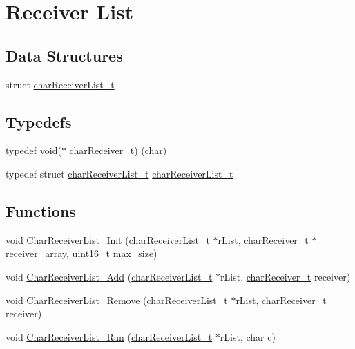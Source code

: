 \hypertarget{group__receiverlist}{}\section{Receiver List}
\label{group__receiverlist}
\subsection*{Data Structures}
\begin{DoxyCompactItemize}
\item 
struct \hyperlink{structchar_receiver_list__t}{char\+Receiver\+List\+\_\+t}
\end{DoxyCompactItemize}
\subsection*{Typedefs}
\begin{DoxyCompactItemize}
\item 
typedef void($\ast$ \hyperlink{group__receiverlist_ga69666a2f4dbb47a4ffd7b07c252777cf}{char\+Receiver\+\_\+t}) (char)
\item 
typedef struct \hyperlink{structchar_receiver_list__t}{char\+Receiver\+List\+\_\+t} \hyperlink{group__receiverlist_gaf028d96c57583ae1c99867ab37a4e097}{char\+Receiver\+List\+\_\+t}
\end{DoxyCompactItemize}
\subsection*{Functions}
\begin{DoxyCompactItemize}
\item 
void \hyperlink{group__receiverlist_ga8cf289548c12196023378e100c54ea7f}{Char\+Receiver\+List\+\_\+\+Init} (\hyperlink{structchar_receiver_list__t}{char\+Receiver\+List\+\_\+t} $\ast$r\+List, \hyperlink{group__receiverlist_ga69666a2f4dbb47a4ffd7b07c252777cf}{char\+Receiver\+\_\+t} $\ast$receiver\+\_\+array, uint16\+\_\+t max\+\_\+size)
\item 
void \hyperlink{group__receiverlist_ga08ce6fb053b59a46b55684e3be6c05e8}{Char\+Receiver\+List\+\_\+\+Add} (\hyperlink{structchar_receiver_list__t}{char\+Receiver\+List\+\_\+t} $\ast$r\+List, \hyperlink{group__receiverlist_ga69666a2f4dbb47a4ffd7b07c252777cf}{char\+Receiver\+\_\+t} receiver)
\item 
void \hyperlink{group__receiverlist_gafca888b64202be312447e5d1b83ae267}{Char\+Receiver\+List\+\_\+\+Remove} (\hyperlink{structchar_receiver_list__t}{char\+Receiver\+List\+\_\+t} $\ast$r\+List, \hyperlink{group__receiverlist_ga69666a2f4dbb47a4ffd7b07c252777cf}{char\+Receiver\+\_\+t} receiver)
\item 
void \hyperlink{group__receiverlist_ga11161549092a40b82743d22ee00ad60d}{Char\+Receiver\+List\+\_\+\+Run} (\hyperlink{structchar_receiver_list__t}{char\+Receiver\+List\+\_\+t} $\ast$r\+List, char c)
\end{DoxyCompactItemize}


